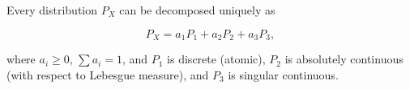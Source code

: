 Every distribution $P_X$ can be decomposed uniquely as

$$P_X = a_1 P_1 + a_2 P_2 + a_3 P_3,$$

where $a_i \geq 0$, $\sum a_i = 1$, and $P_1$ is discrete (atomic), $P_2$ is absolutely continuous (with respect to Lebesgue measure), and $P_3$ is singular continuous.
